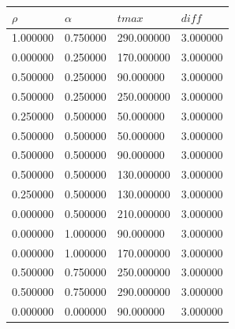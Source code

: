 \documentclass[12pt]{report}
\begin{document}
\begin{center}
	
	\begin{table}[h!]
		\begin{center}
			\begin{tabular}{|llll|}
				\hline
				\multicolumn{1}{|l|}{$\rho$}      & \multicolumn{1}{l|}{$\alpha$} & \multicolumn{1}{l|}{$tmax$} & $diff$      \\ \hline
				\multicolumn{1}{|c}{1.000000} & 0.750000                   & 290.000000                & 3.000000 \\
				0.000000                      & 0.250000                   & 170.000000                & 3.000000 \\
				0.500000                      & 0.250000                   & 90.000000                 & 3.000000 \\
				0.500000                      & 0.250000                   & 250.000000                & 3.000000 \\
				0.250000                      & 0.500000                   & 50.000000                 & 3.000000 \\
				0.500000                      & 0.500000                   & 50.000000                 & 3.000000 \\
				0.500000                      & 0.500000                   & 90.000000                 & 3.000000 \\
				0.500000                      & 0.500000                   & 130.000000                & 3.000000 \\
				0.250000                      & 0.500000                   & 130.000000                & 3.000000 \\
				0.000000                      & 0.500000                   & 210.000000                & 3.000000 \\
				0.000000                      & 1.000000                   & 90.000000                 & 3.000000 \\
				0.000000                      & 1.000000                   & 170.000000                & 3.000000 \\
				0.500000                      & 0.750000                   & 250.000000                & 3.000000 \\
				0.500000                      & 0.750000                   & 290.000000                & 3.000000 \\
				0.000000                      & 0.000000                   & 90.000000                 & 3.000000 \\

\end{tabular}
\end{center}
\end{table}
\end{center}
\end{document}
